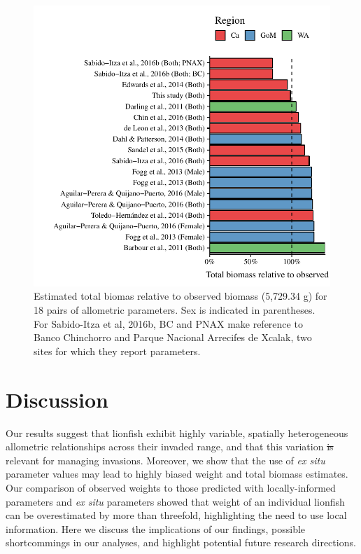 \documentclass[fleqn,10pt,lineno]{wlpeerj} %
\providecommand{\DIFadd}[1]{{\protect\color{blue}\uwave{#1}}} %
\providecommand{\DIFdel}[1]{{\protect\color{red}\sout{#1}}}                      %
\providecommand{\DIFaddbegin}{} %
\providecommand{\DIFaddend}{} %
\providecommand{\DIFdelbegin}{} %
\providecommand{\DIFdelend}{} %
\begin{document}
\begin{figure}
\centering
\includegraphics{Manuscript_files/figure-latex/unnamed-chunk-9-1.pdf}
\caption{\label{fig:errors}Estimated total biomas relative to observed
biomass (5,729.34 g) for 18 pairs of allometric parameters. Sex is
indicated in parentheses. For Sabido-Itza et al, 2016b, BC and PNAX make
reference to Banco Chinchorro and Parque Nacional Arrecifes de Xcalak,
two sites for which they report parameters.}
\end{figure}

\clearpage

\section*{Discussion}

Our results suggest that lionfish exhibit highly variable, spatially
heterogeneous allometric relationships across their invaded range, and
that this variation \DIFdelbegin \DIFdel{is }\DIFdelend \DIFaddbegin \DIFadd{may be }\DIFaddend relevant for managing invasions. Moreover, we
show that the use of \emph{ex situ} parameter values may lead to highly
biased weight and total biomass estimates. Our comparison of observed
weights to those predicted with locally-informed parameters and \emph{ex
situ} parameters showed that weight of an individual lionfish can be
overestimated by more than threefold, highlighting the need to use local
information. Here we discuss the implications of our findings, possible
shortcommings in our analyses, and highlight potential future research
directions.
\end{document}
